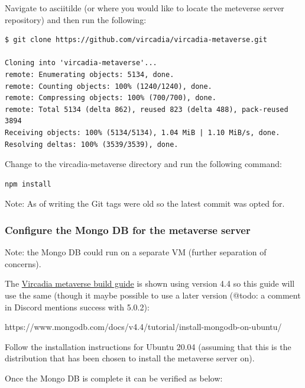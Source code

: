 Navigate to asciitilde{} (or where you would like to locate the
meteverse server repository) and then run the following:

\begin{verbatim}
$ git clone https://github.com/vircadia/vircadia-metaverse.git

Cloning into 'vircadia-metaverse'...
remote: Enumerating objects: 5134, done.
remote: Counting objects: 100% (1240/1240), done.
remote: Compressing objects: 100% (700/700), done.
remote: Total 5134 (delta 862), reused 823 (delta 488), pack-reused 3894
Receiving objects: 100% (5134/5134), 1.04 MiB | 1.10 MiB/s, done.
Resolving deltas: 100% (3539/3539), done.
\end{verbatim}

Change to the vircadia-metaverse directory and run the following
command:

\begin{verbatim}
npm install
\end{verbatim}

Note: As of writing the Git tags were old so the latest commit was opted
for.

\hypertarget{configure-the-mongo-db-for-the-metaverse-server}{%
\subsubsection{Configure the Mongo DB for the metaverse
server}\label{configure-the-mongo-db-for-the-metaverse-server}}

Note: the Mongo DB could run on a separate VM (further separation of
concerns).

The
\href{https://github.com/vircadia/vircadia-metaverse/blob/master/docs/Building.md}{Vircadia
metaverse build guide} is shown using version 4.4 so this guide will use
the same (though it maybe possible to use a later version (@todo: a
comment in Discord mentions success with 5.0.2):

https://www.mongodb.com/docs/v4.4/tutorial/install-mongodb-on-ubuntu/

Follow the installation instructions for Ubuntu 20.04 (assuming that
this is the distribution that has been chosen to install the metaverse
server on).

Once the Mongo DB is complete it can be verified as below:

